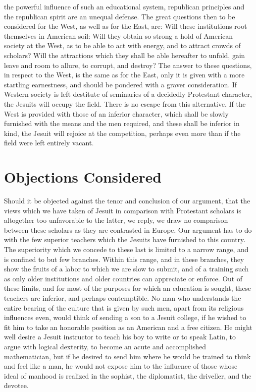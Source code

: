 \documentclass[]{book}
\begin{document}
the powerful influence of such an educational system, republican principles and the republican spirit are an unequal defense. The great questions then to be considered for the West, as well as for the East, are: Will these institutions root themselves in American soil: Will they obtain so strong a hold of American society at the West, as to be able to act with energy, and to attract crowds of scholars? Will the attractions which they shall be able hereafter to unfold, gain leave and room to allure, to corrupt, and destroy? The answer to these questions, in respect to the West, is the same as for the East, only it is given with a more startling earnestness, and should be pondered with a graver consideration. If Western society is left destitute of seminaries of a decidedly Protestant character, the Jesuits will occupy the field. There is no escape from this alternative. If the West is provided with those of an inferior character, which shall be slowly furnished with the means and the men required, and these shall be inferior in kind, the Jesuit will rejoice at the competition, perhaps even more than if the field were left entirely vacant.

\hypertarget{objections-considered}{%
\chapter{Objections Considered}\label{objections-considered}}

Should it be objected against the tenor and conclusion of our argument, that the views which we have taken of Jesuit in comparison with Protestant scholars is altogether too unfavorable to the latter, we reply, we draw no comparison between these scholars as they are contrasted in Europe. Our argument has to do with the few superior teachers which the Jesuits have furnished to this country. The superiority which we concede to these last is limited to a narrow range, and is confined to but few branches. Within this range, and in these branches, they show the fruits of a labor to which we are slow to submit, and of a training such as only older institutions and older countries can appreciate or enforce. Out of these limits, and for most of the purposes for which an education is sought, these teachers are inferior, and perhaps contemptible. No man who understands the entire bearing of the culture that is given by such men, apart from its religious influences even, would think of sending a son to a Jesuit college, if he wished to fit him to take an honorable position as an American and a free citizen. He might well desire a Jesuit instructor to teach his boy to write or to speak Latin, to argue with logical dexterity, to become an acute and accomplished mathematician, but if he desired to send him where he would be trained to think and feel like a man, he would not expose him to the influence of those whose ideal of manhood is realized in the sophist, the diplomatist, the driveller, and the devotee.
\end{document}
